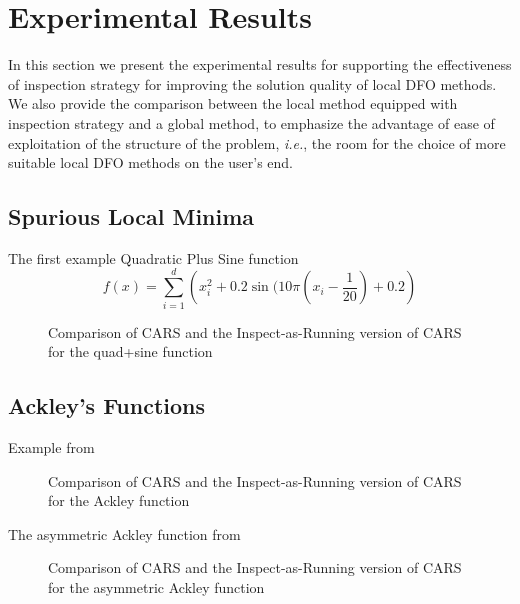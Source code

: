 \section{Experimental Results}
In this section we present the experimental results for supporting the effectiveness of inspection strategy for improving the solution quality of local DFO methods. We also provide the comparison between the local method equipped with inspection strategy and a global method, to emphasize the advantage of ease of exploitation of the structure of the problem, \emph{i.e.}, the room for the choice of more suitable local DFO methods on the user's end.

\subsection{Spurious Local Minima}
The first example 
Quadratic Plus Sine function 
\begin{equation*}
    f(x) =  \sum_{i=1}^{d} \left(x_i^2 + 0.2 \sin(10\pi(x_i - \frac{1}{20}) + 0.2 \right)
\end{equation*}
\begin{figure*}
    \centering
    \caption{Comparison of CARS and the Inspect-as-Running version of CARS for the quad+sine function}
    \label{fig:Convex plus sine}
\end{figure*}

\subsection{Ackley's Functions}
Example from \cite{chen2019run}
\begin{figure*}
    \centering
    \caption{Comparison of CARS and the Inspect-as-Running version of CARS for the Ackley function}
    \label{fig: Ackley}
\end{figure*}

The asymmetric Ackley function from \cite{chen2019run}
\begin{figure*}
    \centering
    \caption{Comparison of CARS and the Inspect-as-Running version of CARS for the asymmetric Ackley function}
    \label{fig: Ackley asymmetric}
\end{figure*}

